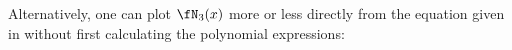 \begin{minipage}{\tw-65mm}
Alternatively, one can plot $\fN_3(x)$ more or less directly from 
the equation given in 
without first calculating the polynomial expressions:
\end{minipage}\hfill{}%
\\


%
